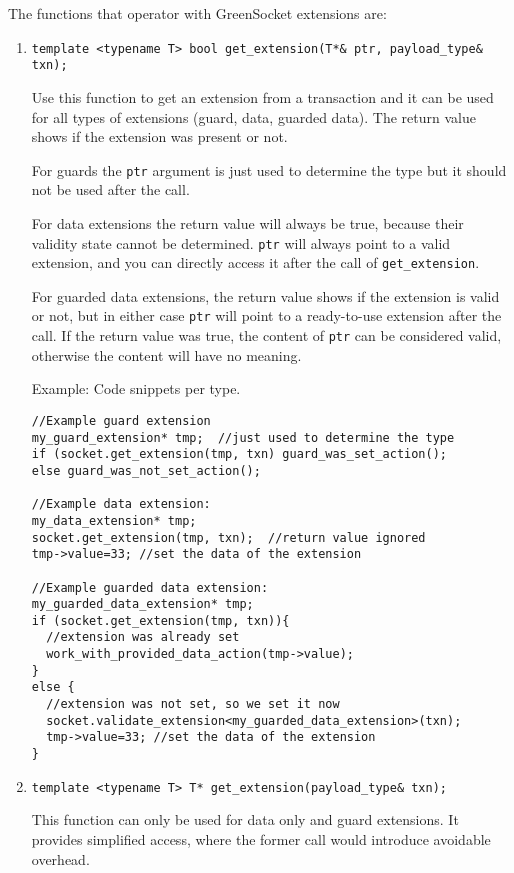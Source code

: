 \documentclass[a4paper,10pt]{article}          %
\begin{document}
The functions that operator with GreenSocket extensions are:

\begin{enumerate}
\item 
\verb|template <typename T> bool get_extension(T*& ptr, payload_type& txn);|

Use this function to get an extension from a transaction and it can be used for all types of extensions (guard, data, guarded data).
The return value shows if the extension was present or not.

For guards the \verb|ptr| argument is just used to determine the type
but it should not be used after the call.

For data extensions the return value will always be true, because their validity state cannot be determined. \verb|ptr| will always point to a valid extension, and you can directly access it after the call of \verb|get_extension|.

For guarded data extensions, the return value shows if the extension is valid or not, but in either case \verb|ptr| will point to a ready-to-use extension after the call. If the return value was true, the content of \verb|ptr| can be considered valid, otherwise the content will have no meaning.

Example: Code snippets per type.

\begin{small}
\begin{verbatim}
//Example guard extension
my_guard_extension* tmp;  //just used to determine the type
if (socket.get_extension(tmp, txn) guard_was_set_action();
else guard_was_not_set_action();

//Example data extension:
my_data_extension* tmp;
socket.get_extension(tmp, txn);  //return value ignored
tmp->value=33; //set the data of the extension

//Example guarded data extension:
my_guarded_data_extension* tmp;
if (socket.get_extension(tmp, txn)){
  //extension was already set
  work_with_provided_data_action(tmp->value);
}
else {
  //extension was not set, so we set it now
  socket.validate_extension<my_guarded_data_extension>(txn);
  tmp->value=33; //set the data of the extension
}
\end{verbatim}
\end{small}

\item 
\verb|template <typename T> T* get_extension(payload_type& txn);|  

This function can only be used for data only and guard extensions.
It provides simplified access, where the former call would introduce avoidable overhead.


\end{enumerate}
\end{document}
